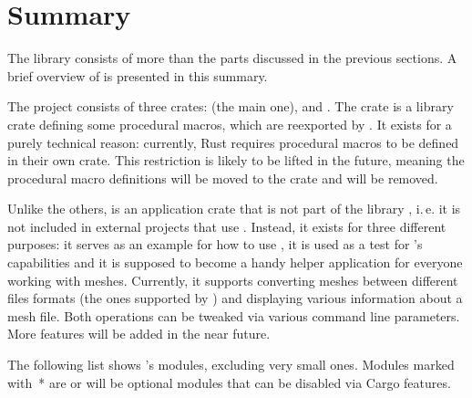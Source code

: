 \section{Summary}

The library  consists of more than the parts discussed in the previous sections.
A brief overview of  is presented in this summary.

The project consists of three crates:  (the main one),  and .
The crate  is a library crate defining some procedural macros, which are reexported by .
It exists for a purely technical reason: currently, Rust requires procedural macros to be defined in their own crate.
This restriction is likely to be lifted in the future, meaning the procedural macro definitions will be moved to the crate  and  will be removed.

Unlike the others,  is an application crate that is not part of the library , i.\,e. it is not included in external projects that use .
Instead, it exists for three different purposes: it serves as an example for how to use , it is used as a test for 's capabilities and it is supposed to become a handy helper application for everyone working with meshes.
Currently, it supports converting meshes between different files formats (the ones supported by ) and displaying various information about a mesh file.
Both operations can be tweaked via various command line parameters.
More features will be added in the near future.

The following list shows 's modules, excluding very small ones.
Modules marked with~* are or will be optional modules that can be disabled via Cargo features.

